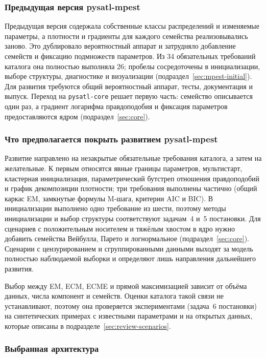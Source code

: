 \subsubsection{Предыдущая версия pysatl-mpest}

Предыдущая версия содержала собственные классы распределений и изменяемые параметры, а плотности и градиенты для каждого семейства реализовывались заново. Это дублировало вероятностный аппарат и затрудняло добавление семейств и фиксацию подмножеств параметров. Из 34 обязательных требований каталога она полностью выполняла 26; пробелы сосредоточены в инициализации, выборе структуры, диагностике и визуализации (подраздел~\ref{sec:mpest-initial}). Для развития требуются общий вероятностный аппарат, тесты, документация и выпуск. Переход на \texttt{pysatl-core} решает первую часть: семейство описывается один раз, а градиент логарифма правдоподобия и фиксация параметров предоставляются ядром (подраздел~\ref{sec:core}).

\subsubsection{Что предполагается покрыть развитием pysatl-mpest}

Развитие направлено на незакрытые обязательные требования каталога, а затем на желательные. К первым относятся явные границы параметров, мультистарт, кластерная инициализация, параметрический бутстреп отношения правдоподобий и график декомпозиции плотности; три требования выполнены частично (общий каркас EM, замкнутые формулы M-шага, критерии AIC и BIC). В инициализации выполнено одно требование из шести, поэтому методы инициализации и выбор структуры соответствуют задачам~4 и~5 постановки. Для сценариев с положительным носителем и тяжёлым хвостом в ядро нужно добавить семейства Вейбулла, Парето и логнормальное (подраздел~\ref{sec:core}). Сценарии с цензурированием и сгруппированными данными выходят за модель полностью наблюдаемой выборки и определяют лишь направления дальнейшего развития.

Выбор между EM, ECM, ECME и прямой максимизацией зависит от объёма данных, числа компонент и семейств. Оценки каталога такой связи не устанавливают, поэтому она проверяется экспериментами (задача~6 постановки) на синтетических примерах с известными параметрами и на открытых данных, которые описаны в подразделе~\ref{sec:review-scenarios}.

\subsubsection{Выбранная архитектура}

